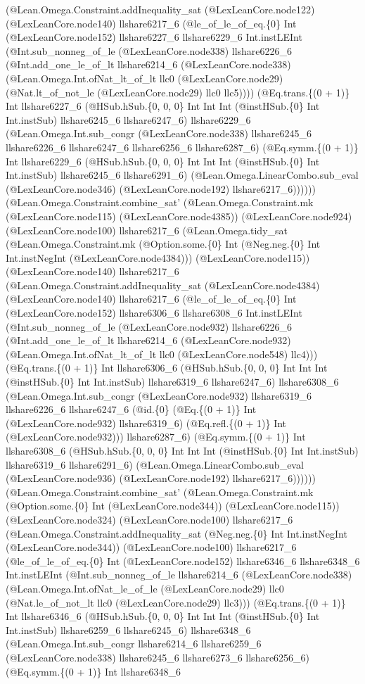 \documentclass[11pt]{article}
\begin{document}
(@Lean.Omega.Constraint.addInequality\_sat (@LexLeanCore.node122) (@LexLeanCore.node140) llshare6217\_6 (@le\_of\_le\_of\_eq.\{0\} Int (@LexLeanCore.node152) llshare6227\_6 llshare6229\_6 Int.instLEInt (@Int.sub\_nonneg\_of\_le (@LexLeanCore.node338) llshare6226\_6 (@Int.add\_one\_le\_of\_lt llshare6214\_6 (@LexLeanCore.node338) (@Lean.Omega.Int.ofNat\_lt\_of\_lt llc0 (@LexLeanCore.node29) (@Nat.lt\_of\_not\_le (@LexLeanCore.node29) llc0 llc5)))) (@Eq.trans.\{(0 + 1)\} Int llshare6227\_6 (@HSub.hSub.\{0, 0, 0\} Int Int Int (@instHSub.\{0\} Int Int.instSub) llshare6245\_6 llshare6247\_6) llshare6229\_6 (@Lean.Omega.Int.sub\_congr (@LexLeanCore.node338) llshare6245\_6 llshare6226\_6 llshare6247\_6 llshare6256\_6 llshare6287\_6) (@Eq.symm.\{(0 + 1)\} Int llshare6229\_6 (@HSub.hSub.\{0, 0, 0\} Int Int Int (@instHSub.\{0\} Int Int.instSub) llshare6245\_6 llshare6291\_6) (@Lean.Omega.LinearCombo.sub\_eval (@LexLeanCore.node346) (@LexLeanCore.node192) llshare6217\_6)))))) (@Lean.Omega.Constraint.combine\_sat' (@Lean.Omega.Constraint.mk (@LexLeanCore.node115) (@LexLeanCore.node4385)) (@LexLeanCore.node924) (@LexLeanCore.node100) llshare6217\_6 (@Lean.Omega.tidy\_sat (@Lean.Omega.Constraint.mk (@Option.some.\{0\} Int (@Neg.neg.\{0\} Int Int.instNegInt (@LexLeanCore.node4384))) (@LexLeanCore.node115)) (@LexLeanCore.node140) llshare6217\_6 (@Lean.Omega.Constraint.addInequality\_sat (@LexLeanCore.node4384) (@LexLeanCore.node140) llshare6217\_6 (@le\_of\_le\_of\_eq.\{0\} Int (@LexLeanCore.node152) llshare6306\_6 llshare6308\_6 Int.instLEInt (@Int.sub\_nonneg\_of\_le (@LexLeanCore.node932) llshare6226\_6 (@Int.add\_one\_le\_of\_lt llshare6214\_6 (@LexLeanCore.node932) (@Lean.Omega.Int.ofNat\_lt\_of\_lt llc0 (@LexLeanCore.node548) llc4))) (@Eq.trans.\{(0 + 1)\} Int llshare6306\_6 (@HSub.hSub.\{0, 0, 0\} Int Int Int (@instHSub.\{0\} Int Int.instSub) llshare6319\_6 llshare6247\_6) llshare6308\_6 (@Lean.Omega.Int.sub\_congr (@LexLeanCore.node932) llshare6319\_6 llshare6226\_6 llshare6247\_6 (@id.\{0\} (@Eq.\{(0 + 1)\} Int (@LexLeanCore.node932) llshare6319\_6) (@Eq.refl.\{(0 + 1)\} Int (@LexLeanCore.node932))) llshare6287\_6) (@Eq.symm.\{(0 + 1)\} Int llshare6308\_6 (@HSub.hSub.\{0, 0, 0\} Int Int Int (@instHSub.\{0\} Int Int.instSub) llshare6319\_6 llshare6291\_6) (@Lean.Omega.LinearCombo.sub\_eval (@LexLeanCore.node936) (@LexLeanCore.node192) llshare6217\_6)))))) (@Lean.Omega.Constraint.combine\_sat' (@Lean.Omega.Constraint.mk (@Option.some.\{0\} Int (@LexLeanCore.node344)) (@LexLeanCore.node115)) (@LexLeanCore.node324) (@LexLeanCore.node100) llshare6217\_6 (@Lean.Omega.Constraint.addInequality\_sat (@Neg.neg.\{0\} Int Int.instNegInt (@LexLeanCore.node344)) (@LexLeanCore.node100) llshare6217\_6 (@le\_of\_le\_of\_eq.\{0\} Int (@LexLeanCore.node152) llshare6346\_6 llshare6348\_6 Int.instLEInt (@Int.sub\_nonneg\_of\_le llshare6214\_6 (@LexLeanCore.node338) (@Lean.Omega.Int.ofNat\_le\_of\_le (@LexLeanCore.node29) llc0 (@Nat.le\_of\_not\_lt llc0 (@LexLeanCore.node29) llc3))) (@Eq.trans.\{(0 + 1)\} Int llshare6346\_6 (@HSub.hSub.\{0, 0, 0\} Int Int Int (@instHSub.\{0\} Int Int.instSub) llshare6259\_6 llshare6245\_6) llshare6348\_6 (@Lean.Omega.Int.sub\_congr llshare6214\_6 llshare6259\_6 (@LexLeanCore.node338) llshare6245\_6 llshare6273\_6 llshare6256\_6) (@Eq.symm.\{(0 + 1)\} Int llshare6348\_6 
\end{document}

